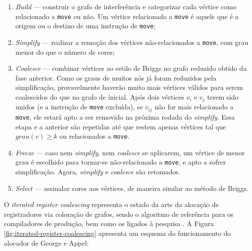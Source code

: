 \documentclass[
	12pt,				%
	openright,			%
	oneside,			%
	a4paper,			%
	tccpreliminar,			%
	]{ABNT-DC-UEL}
\begin{document}
\begin{enumerate}
    \item \textit{Build} --- construir o grafo de interferência e categorizar cada vértice como relacionado a \texttt{move} ou não. Um vértice relacionado a \texttt{move} é aquele que é a origem ou o destino de uma instrução de \texttt{move};
    \item \textit{Simplify} --- realizar a remoção dos vértices não-relacionados a \texttt{move}, com grau menor do que o número de cores;
    \item \textit{Coalesce} --- combinar vértices ao estilo de Briggs no grafo reduzido obtido da fase anterior. Como os graus de muitos nós já foram reduzidos pela simplificação, provavelmente haverão muito mais vértices válidos para serem coalescidos do que no grafo de inicial. Após dois vértices $v_i$ e $v_j$ terem sido unidos (e a instrução de \texttt{move} excluída), se $v_{ij}$ não for mais relacionado a \texttt{move}, ele estará apto a ser removido na próxima rodada do \textit{simplify}. Essa etapa e a anterior são repetidas até que restem apenas vértices tal que $grau(v)\geq k$ ou relacionados a \texttt{move}.
    \item \textit{Freeze} --- caso nem \textit{simplify}, nem \textit{coalesce} se aplicarem, um vértice de menor grau é escolhido para tornar-se não-relacionado a \texttt{move}, e apto a sofrer simplificação. Agora, \textit{simplify} e \textit{coalesce} são retomados.
    \item \textit{Select} --- assinalar cores aos vértices, de maneira similar ao método de Briggs.
\end{enumerate}

O \textit{iterated register coalescing} representa o estado da arte da alocação de registradores via coloração de grafos, sendo o algoritmo de referência para os compiladores de produção, bem como os ligados à pesquisa \cite{protzenko:09}. A Figura \ref{fig:iterated-register-coalescing} apresenta um esquema do funcionamento do alocador de George e Appel:
\end{document}
